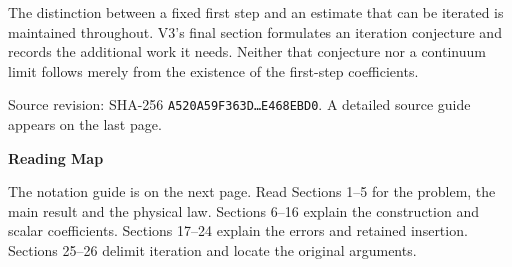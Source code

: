 \documentclass[11pt,a4paper]{article}
\begin{document}
The distinction between a fixed first step and an estimate that can be iterated is maintained throughout. V3's final section formulates an iteration conjecture and records the additional work it needs. Neither that conjecture nor a continuum limit follows merely from the existence of the first-step coefficients.

\vfill
{\small\color{muted}Source revision: SHA-256 \texttt{A520A59F363D\ldots E468EBD0}.\quad
    A detailed source guide appears on the last page.\par}

\clearpage
\thispagestyle{fancy}
{\LARGE\bfseries\color{ink}Reading Map\par}
\vspace{9pt}
The notation guide is on the next page. Read Sections 1--5 for the problem, the main result and the physical law. Sections 6--16 explain the construction and scalar coefficients. Sections 17--24 explain the errors and retained insertion. Sections 25--26 delimit iteration and locate the original arguments.
\end{document}
